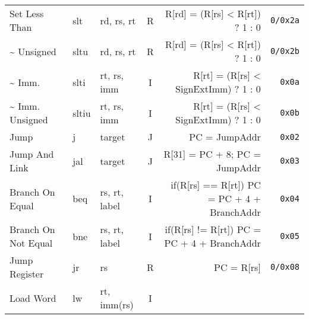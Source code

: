 \begin{tabularx}{\textwidth}{lMAcDr}
    \midrule
    Set Less Than                                                                   & slt    & rd, rs, rt    & R &
    R[rd] = (R[rs] < R[rt]) ? 1 : 0                                                 & \texttt{0/0x2a}                       \\
    \quad\textasciitilde{} Unsigned                                                          & sltu   & rd, rs, rt    & R &
    R[rd] = (R[rs] < R[rt]) ? 1 : 0                \footnotemark[6]                 & \texttt{0/0x2b}                       \\
    \quad\textasciitilde{} Imm.                                                              & slti   & rt, rs, imm   & I &
    R[rt] = (R[rs] < SignExtImm) ? 1 : 0           \footnotemark[2]                 & \texttt{0x0a}                       \\
    \quad\textasciitilde{} Imm. Unsigned                                                     & sltiu  & rt, rs, imm   & I &
    R[rt] = (R[rs] < SignExtImm) ? 1 : 0           \footnotemark[2]\footnotemark[6] & \texttt{0x0b}                       \\
    \midrule
    Jump                                                                            & j      & target        & J &
    PC = JumpAddr                                  \footnotemark[5]                 & \texttt{0x02}                       \\
    Jump And Link                                                                   & jal    & target        & J &
    R[31] = PC + 8; PC = JumpAddr                  \footnotemark[5]                 & \texttt{0x03}                       \\
    Branch On Equal                                                                 & beq    & rs, rt, label & I &
    if(R[rs] == R[rt]) PC = PC + 4 + BranchAddr    \footnotemark[4]                 & \texttt{0x04}                       \\
    Branch On Not Equal                                                             & bne    & rs, rt, label & I &
    if(R[rs] != R[rt]) PC = PC + 4 + BranchAddr    \footnotemark[4]                 & \texttt{0x05}                       \\
    Jump Register                                                                   & jr     & rs            & R &
    PC = R[rs]                                                                      & \texttt{0/0x08}                       \\
    \midrule
    Load Word                                                                       & lw     & rt, imm(rs)   & I &

\end{tabularx}

